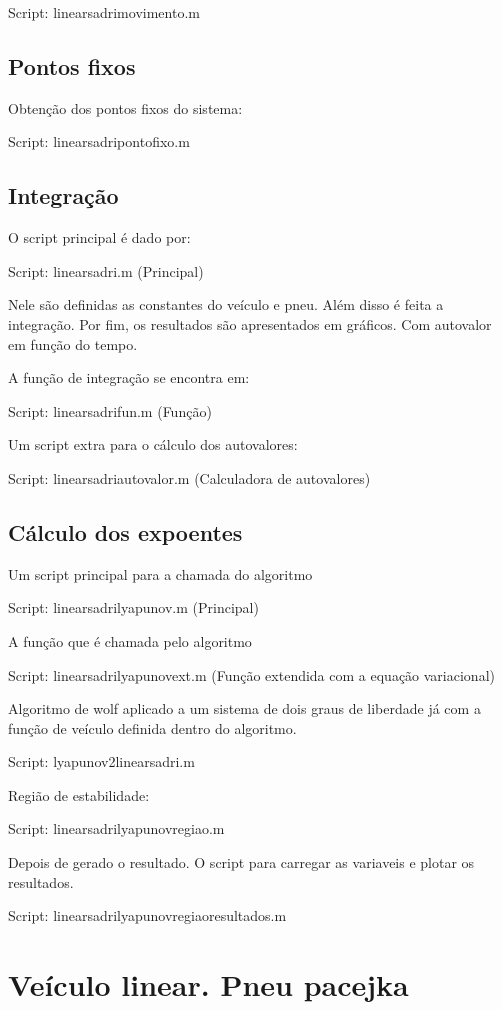 \documentclass[sublist]{fei}
\begin{document}
Script: linearsadrimovimento.m

\section{Pontos fixos}

Obtenção dos pontos fixos do sistema:

Script: linearsadripontofixo.m

\section{Integração}

O script principal é dado por:

Script: linearsadri.m (Principal)

Nele são definidas as constantes do veículo e pneu. Além disso é feita a integração. Por fim, os resultados são apresentados em gráficos. Com autovalor em função do tempo.

A função de integração se encontra em:

Script: linearsadrifun.m (Função)

Um script extra para o cálculo dos autovalores:

Script: linearsadriautovalor.m (Calculadora de autovalores)

\section{Cálculo dos expoentes}

Um script principal para a chamada do algoritmo

Script: linearsadrilyapunov.m (Principal)

A função que é chamada pelo algoritmo

Script: linearsadrilyapunovext.m (Função extendida com a equação variacional)

Algoritmo de wolf aplicado a um sistema de dois graus de liberdade já com a função de veículo definida dentro do algoritmo.

Script: lyapunov2linearsadri.m

Região de estabilidade:

Script: linearsadrilyapunovregiao.m

Depois de gerado o resultado. O script para carregar as variaveis e plotar os resultados.

Script: linearsadrilyapunovregiaoresultados.m

\chapter{Veículo linear. Pneu pacejka} 
\end{document}
